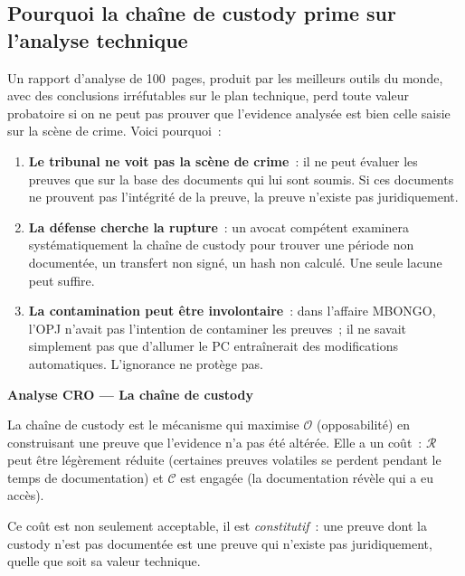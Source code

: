 \subsection{Pourquoi la chaîne de custody prime sur l'analyse technique}

Un rapport d'analyse de 100~pages, produit par les meilleurs outils du
monde, avec des conclusions irréfutables sur le plan technique, perd toute
valeur probatoire si on ne peut pas prouver que l'evidence analysée est
bien celle saisie sur la scène de crime. Voici pourquoi~:

\begin{enumerate}
    \item \textbf{Le tribunal ne voit pas la scène de crime}~: il ne peut
          évaluer les preuves que sur la base des documents qui lui sont
          soumis. Si ces documents ne prouvent pas l'intégrité de la preuve,
          la preuve n'existe pas juridiquement.
    \item \textbf{La défense cherche la rupture}~: un avocat compétent
          examinera systématiquement la chaîne de custody pour trouver
          une période non documentée, un transfert non signé, un hash
          non calculé. Une seule lacune peut suffire.
    \item \textbf{La contamination peut être involontaire}~: dans l'affaire
          MBONGO, l'OPJ n'avait pas l'intention de contaminer les preuves~;
          il ne savait simplement pas que d'allumer le PC entraînerait
          des modifications automatiques. L'ignorance ne protège pas.
\end{enumerate}

\begin{boxCRO}
\textbf{Analyse CRO --- La chaîne de custody}

La chaîne de custody est le mécanisme qui maximise $\mathcal{O}$
(opposabilité) en construisant une preuve que l'evidence n'a pas été
altérée. Elle a un coût~: $\mathcal{R}$ peut être légèrement réduite
(certaines preuves volatiles se perdent pendant le temps de documentation)
et $\mathcal{C}$ est engagée (la documentation révèle qui a eu accès).

Ce coût est non seulement acceptable, il est \emph{constitutif}~: une preuve
dont la custody n'est pas documentée est une preuve qui n'existe pas
juridiquement, quelle que soit sa valeur technique.

\end{boxCRO}

